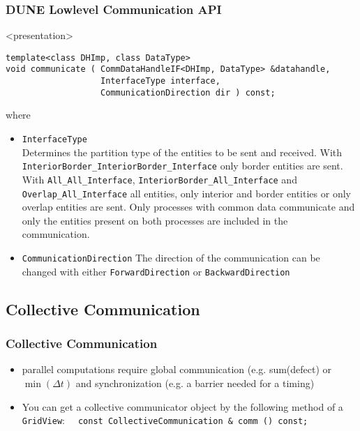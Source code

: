 \begin{frame}[fragile]
  \frametitle<presentation>{DUNE Lowlevel Communication API}
  \begin{onlyenv}<presentation>
    \begin{lstlisting}
template<class DHImp, class DataType>
void communicate ( CommDataHandleIF<DHImp, DataType> &datahandle,
                   InterfaceType interface,
                   CommunicationDirection dir ) const;
    \end{lstlisting}
\lstset{basicstyle=\normalsize\ttfamily}
where
    \end{onlyenv}
    \begin{itemize}
    \item \lstinline!InterfaceType!\\
    Determines the partition type of the entities to be sent and received. With \lstinline!InteriorBorder_InteriorBorder_Interface! only
border entities are sent. With \lstinline!All_All_Interface!,
    \lstinline!InteriorBorder_All_Interface! and
    \lstinline!Overlap_All_Interface! all entities, only interior and border entities or only overlap entities are sent. Only processes with common
data communicate and only the entities present on both processes are included in the communication.
    \item \lstinline!CommunicationDirection!
      The direction of the communication can be changed with either \lstinline!ForwardDirection! or
      \lstinline!BackwardDirection!
    \end{itemize}
\end{frame}



\subsection{Collective Communication}

\begin{frame}[fragile]
  \frametitle<presentation>{Collective Communication}
  \begin{itemize}
  \item parallel computations require global communication (e.g. sum(defect) or $\min(\Delta t)$
        and synchronization (e.g. a barrier needed for a timing)
  \item You can get a collective communicator object by the following method of a \lstinline!GridView!:
    \lstinline!  const CollectiveCommunication & comm () const;!
  \end{itemize}
\vfill
\vfill
\vfill
\vfill
\vfill
\vfill

\end{frame}

